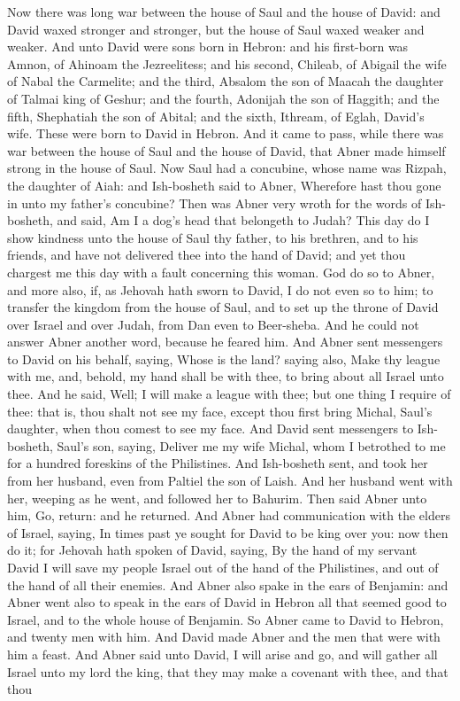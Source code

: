 Now there was long war between the house of Saul and the house of David: and David waxed stronger and stronger, but the house of Saul waxed weaker and weaker.  And unto David were sons born in Hebron: and his first-born was Amnon, of Ahinoam the Jezreelitess; and his second, Chileab, of Abigail the wife of Nabal the Carmelite; and the third, Absalom the son of Maacah the daughter of Talmai king of Geshur; and the fourth, Adonijah the son of Haggith; and the fifth, Shephatiah the son of Abital; and the sixth, Ithream, of Eglah, David’s wife. These were born to David in Hebron.  And it came to pass, while there was war between the house of Saul and the house of David, that Abner made himself strong in the house of Saul. Now Saul had a concubine, whose name was Rizpah, the daughter of Aiah: and Ish-bosheth said to Abner, Wherefore hast thou gone in unto my father’s concubine? Then was Abner very wroth for the words of Ish-bosheth, and said, Am I a dog’s head that belongeth to Judah? This day do I show kindness unto the house of Saul thy father, to his brethren, and to his friends, and have not delivered thee into the hand of David; and yet thou chargest me this day with a fault concerning this woman. God do so to Abner, and more also, if, as Jehovah hath sworn to David, I do not even so to him; to transfer the kingdom from the house of Saul, and to set up the throne of David over Israel and over Judah, from Dan even to Beer-sheba. And he could not answer Abner another word, because he feared him.  And Abner sent messengers to David on his behalf, saying, Whose is the land? saying also, Make thy league with me, and, behold, my hand shall be with thee, to bring about all Israel unto thee. And he said, Well; I will make a league with thee; but one thing I require of thee: that is, thou shalt not see my face, except thou first bring Michal, Saul’s daughter, when thou comest to see my face. And David sent messengers to Ish-bosheth, Saul’s son, saying, Deliver me my wife Michal, whom I betrothed to me for a hundred foreskins of the Philistines. And Ish-bosheth sent, and took her from her husband, even from Paltiel the son of Laish. And her husband went with her, weeping as he went, and followed her to Bahurim. Then said Abner unto him, Go, return: and he returned.  And Abner had communication with the elders of Israel, saying, In times past ye sought for David to be king over you: now then do it; for Jehovah hath spoken of David, saying, By the hand of my servant David I will save my people Israel out of the hand of the Philistines, and out of the hand of all their enemies. And Abner also spake in the ears of Benjamin: and Abner went also to speak in the ears of David in Hebron all that seemed good to Israel, and to the whole house of Benjamin. So Abner came to David to Hebron, and twenty men with him. And David made Abner and the men that were with him a feast. And Abner said unto David, I will arise and go, and will gather all Israel unto my lord the king, that they may make a covenant with thee, and that thou 